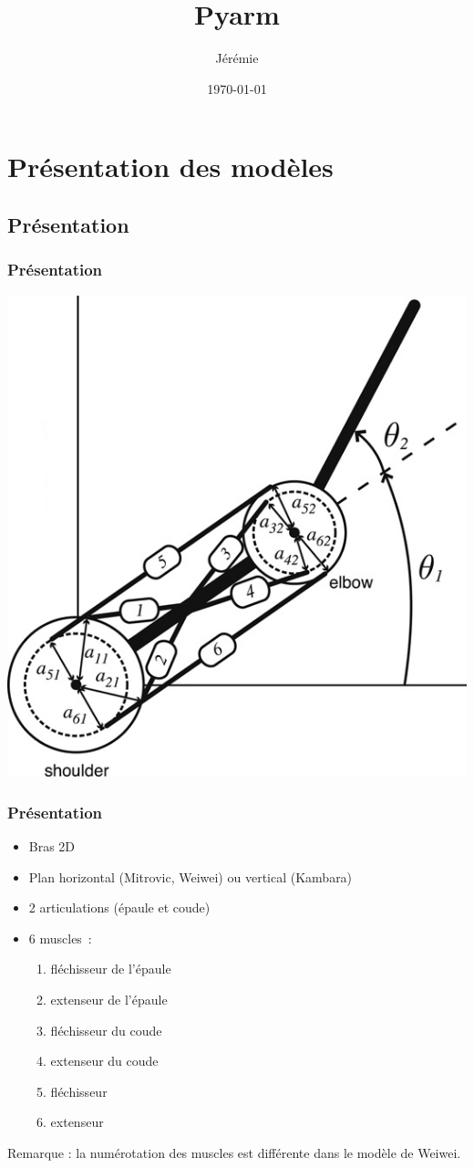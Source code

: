 \documentclass{beamer}
\title{Pyarm}
\author{Jérémie \bsc{Decock}}
\institute{ISIR}
\date{\today{}}
\begin{document}
\begin{frame}
\titlepage
\end{frame}


\section{Présentation des modèles}

\subsection{Présentation}

\begin{frame}
\frametitle{Présentation}
\begin{center}
        \includegraphics[width=.40\linewidth]{fig/arm}
\end{center}
\end{frame}

\begin{frame}
\frametitle{Présentation}
\begin{itemize}
    \item Bras 2D
    \item Plan horizontal (Mitrovic, Weiwei) ou vertical (Kambara)
    \item 2 articulations (épaule et coude)
    \item 6 muscles~:
    \begin{enumerate}
        \item fléchisseur de l'épaule
        \item extenseur de l'épaule
        \item fléchisseur du coude
        \item extenseur du coude
        \item fléchisseur
        \item extenseur
    \end{enumerate}
\end{itemize}
Remarque : la numérotation des muscles est différente dans le modèle de Weiwei.
\end{frame}
\end{document}
